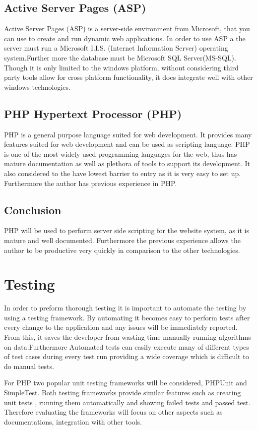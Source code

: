 \documentclass[a4paper,oneside,11pt]{report}
\begin{document}
\subsection{ Active Server Pages (ASP)} 
 Active Server Pages (ASP) is a server-side environment from Microsoft, that you can use to create and run dynamic web applications. In order to use ASP a the server must run a Microsoft I.I.S. (Internet Information Server) operating system.Further more the database must be Microsoft SQL Server(MS-SQL). Though it is only limited to the windows platform, without considering third party tools allow for cross platform functionality, it does integrate well with other windows technologies.
 
\subsection{PHP Hypertext Processor (PHP) } 
PHP is a general purpose language suited for web development. It provides many features suited for web development and can be used as scripting language. PHP is one of the most widely used programming languages for the web, thus has mature documentation as well as plethora of tools to support its development. It also considered to the have lowest barrier to entry as it is very easy to set up. Furthermore the author has previous experience in PHP.

\subsection{Conclusion}
PHP will be used to perform server side scripting for the website system, as it is mature and well documented. Furthermore the previous experience allows the author to be productive very quickly in comparison to the other technologies.
\section{Testing}
In order to preform thorough testing it is important to automate the testing by using a testing framework. By automating it becomes easy to perform tests after every change to the application and any issues will be immediately reported. From this, it saves the developer from wasting time manually running algorithms on data.Furthermore Automated tests can easily execute many of different types of test cases during every test run providing a wide coverage which is difficult to do manual tests.

For PHP two popular unit testing frameworks will be considered, PHPUnit and SimpleTest. Both testing frameworks provide similar features such as creating unit tests , running them automatically and showing failed tests and passed test. Therefore evaluating the frameworks will focus on other aspects such as documentations, integration with other tools.
\end{document}
